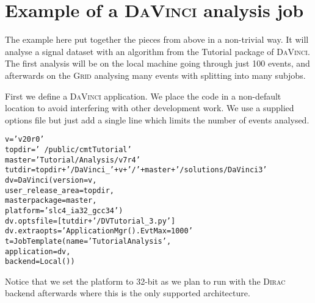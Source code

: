 \documentclass{howto}
\def\davinci {\textsc{DaVinci}\xspace}
\def\dirac {\textsc{Dirac}\xspace}
\def\grid {\textsc{Grid}\xspace}
\def\davinciv {v20r0\xspace}
\def\tutorialv {v7r4\xspace}
\begin{document}
\section{Example of a \davinci analysis job}
\label{sec:Example}
The example here put together the pieces from above in a non-trivial way. It
will analyse a signal dataset with an algorithm from the Tutorial package of
\davinci. The first analysis will be on the local machine going through just
100 events, and afterwards on the \grid analysing many events with splitting
into many subjobs.

First we define a \davinci application. We place the code in a non-default
location to avoid interfering with other development work. We use a supplied
options file but just add a single line which limits the number of events
analysed.
\begin{alltt}
v = '\davinciv'
topdir='~/public/cmtTutorial'
master='Tutorial/Analysis/\tutorialv'
tutdir=topdir+'/DaVinci_'+v+'/'+master+'/solutions/DaVinci3'
dv = DaVinci(version=v,
             user_release_area=topdir, 
             masterpackage=master,
             platform='slc4_ia32_gcc34')
dv.optsfile=[tutdir+'/DVTutorial_3.py']
dv.extraopts='ApplicationMgr().EvtMax = 1000'
t = JobTemplate(name='TutorialAnalysis',
                application=dv, 
                backend=Local())
\end{alltt}
Notice that we set the platform to 32-bit as we plan to run with the \dirac
backend afterwards where this is the only supported architecture.
\end{document}
